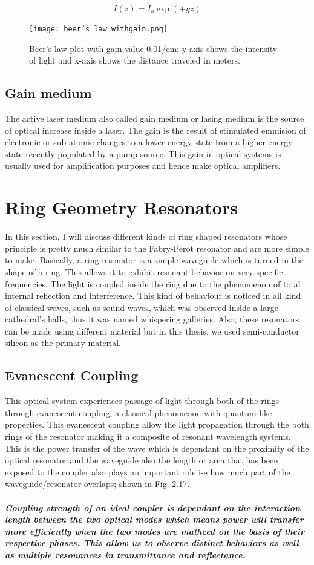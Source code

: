 \begin{equation}
I(z) = I_{o}\exp( +g z)
\end{equation}

\begin{figure}[h]
\centering
\texttt{[image: beer's\_law\_withgain.png]}
\caption{Beer's law plot with gain value 0.01/cm: y-axis shows the intensity of light and x-axis shows the distance traveled in meters.}
\end{figure}

\subsection{Gain medium}
The active laser medium also called gain medium or lasing medium is the source of optical increase inside a laser. The gain is the result of stimulated emmision of electronic or sub-atomic changes to a lower energy state from a higher energy state recently populated by a pump source. This gain in optical systems is usually used for amplification purposes and hence make optical amplifiers.


\section{Ring Geometry Resonators}
In this section, I will discuss different kinds of ring shaped resonators whose principle is pretty much similar to the Fabry-Perot resonator and are more simple to make. Basically, a ring resonator is a simple waveguide which is turned in the shape of a ring. This allows it to exhibit resonant behavior on very specific frequencies. The light is coupled inside the ring due to the phenomenon of total internal reflection and interference. This kind of behaviour is noticed in all kind of classical waves, such as sound waves, which was observed inside a large cathedral's halls, thus it was named whispering galleries. Also, these resonators can be made using different material but in this thesis, we used semi-conductor silicon as the primary material. 

\subsection{Evanescent Coupling}
This optical system experiences passage of light through both of the rings through evanescent coupling, a classical phenomenon with quantum like properties. This evanescent coupling allow the light propagation through the both rings of the resonator making it a composite of resonant wavelength systems. This is the power transfer of the wave which is dependant on the proximity of the optical resonator and the waveguide also the length or area that has been exposed to the coupler also plays an important role i-e how much part of the waveguide/resonator overlaps; shown in Fig. 2.17.
\subparagraph{\normalfont \large Coupling strength of an ideal coupler is dependant on the interaction length between the two optical modes which means power will transfer more efficiently when the two modes are mathced on the basis of their respective phases.  This allow us to observe distinct behaviors as well as multiple resonances in transmittance and reflectance.} 

